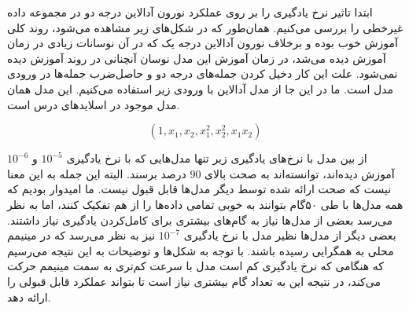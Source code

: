 \documentclass[12pt, a4paper]{article}
\begin{document}
ابتدا تاثیر نرخ یادگیری را بر روی عملکرد نورون آدالاین درجه دو در مجموعه داده غیرخطی
را بررسی می‌کنیم. همان‌طور که در شکل‌های زیر مشاهده می‌شود، روند کلی آموزش خوب بوده و
برخلاف نورون آدالاین درجه یک که در آن نوسانات زیادی در زمان آموزش دیده می‌شد، در زمان
آموزش این مدل نوسان آنچنانی در روند آموزش دیده نمی‌شود. علت این کار دخیل کردن جمله‌های درجه‌ دو
و حاصل‌ضرب جمله‌ها در ورودی مدل است. ما در این جا از مدل آدالاین با ورودی زیر استفاده می‌کنیم.
این مدل همان مدل موجود در اسلاید‌های درس است.

$$(1, x_1, x_2, x_1^2, x_2^2, x_1 x_2)$$

از بین مدل با نرخ‌های یادگیری زیر تنها مدل‌هایی که با نرخ یادگیری $10^{-5}$ و $10^{-6}$
آموزش دیده‌اند، توانسته‌اند به صحت بالای 90 درصد برسند. البته این جمله به این معنا نیست که
صحت ارائه شده توسط دیگر مدل‌ها قابل قبول نیست. ما امیدوار بودیم که همه مدل‌ها با طی ۵۰گام
بتوانند به خوبی تمامی داده‌ها را از هم تفکیک کنند، اما به نظر می‌رسد بعضی از مدل‌ها نیاز به
گام‌های بیشتری برای کامل‌کردن یادگیری نیاز داشتند. بعضی دیگر از مدل‌ها نظیر مدل با نرخ یادگیری
$10^{-7}$ نیز به نظر می‌رسد که در مینیمم محلی به همگرایی رسیده باشند. با توجه به شکل‌ها
و توضیحات به این نتیجه می‌رسیم که هنگامی که نرخ یادگیری کم است
مدل با سرعت کم‌تری به سمت مینیمم حرکت می‌کند، در نتیجه این به تعداد گام بیشتری نیاز است
تا بتواند عملکرد قابل قبولی را ارائه دهد.

\vspace{1cm}
\end{document}
